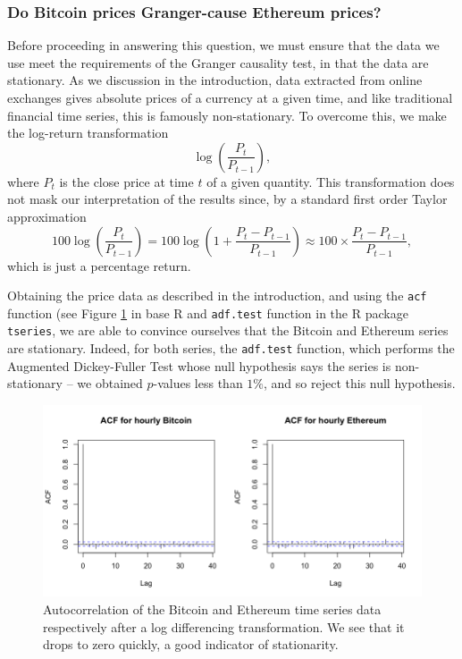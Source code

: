 \documentclass[twoside]{report}
\newcommand{\code}{\texttt}
\begin{document}
\begin{spacing}{1}
\subsubsection{Do Bitcoin prices Granger-cause Ethereum prices?}
Before proceeding in answering this question, we must ensure that the data we use meet the requirements of the Granger causality test, in that the data are stationary. As we discussion in the introduction, data extracted from online exchanges gives absolute prices of a currency at a given time, and like traditional financial time series, this is famously non-stationary. To overcome this, we make the log-return transformation \[
\log\left(\frac{P_t}{P_{t-1}}\right), 
\]
where $P_t$ is the close price at time $t$ of a given quantity. This transformation does not mask our interpretation of the results since, by a standard first order Taylor approximation \[
100\log\left(\frac{P_t}{P_{t-1}}\right) = 100\log\left(1 + \frac{P_t - P_{t-1}}{P_{t-1}}\right) \approx 100 \times \frac{P_t - P_{t-1}}{P_{t-1}},
\]
which is just a percentage return.

Obtaining the price data as described in the introduction, and using the \code{acf} function (see Figure \ref{fig:acf_btc_eth} in base R and \code{adf.test} function in the R package \code{tseries}, we are able to convince ourselves that the Bitcoin and Ethereum series are stationary. Indeed, for both series, the \code{adf.test} function, which performs the Augmented Dickey-Fuller Test whose null hypothesis says the series is non-stationary \cite{adftest} -- we obtained $p$-values less than $1\%$, and so reject this null hypothesis. 

\begin{figure}[!htbp]
    \centering
    \includegraphics[width=\linewidth]{Causality_between_time_series/acf_btc_eth.png}
    \caption{Autocorrelation of the Bitcoin and Ethereum time series data respectively after a log differencing transformation. We see that it drops to zero quickly, a good indicator of stationarity.}
    \label{fig:acf_btc_eth}
\end{figure}


\end{spacing}
\end{document}
